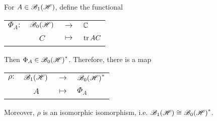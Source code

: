 \documentclass[a4paper,11pt]{report}
\begin{document}
\begin{thm}
	For $A \in \mathscr{B}_{1}\mathscr{(H)}$, define the functional
	\begin{center}
		\begin{tabular}{l c c l}
			$\Phi_A \colon$ & $\mathscr{B}_{0}\mathscr{(H)}$ & $\longrightarrow$ & $\mathbb{C}$ \\
			~ & $C$ & $\longmapsto$ & $\operatorname{tr}{AC}$
		\end{tabular}
	\end{center}
	Then $\Phi_A \in \mathscr{B}_{0}\mathscr{(H)}^{*}$. Therefore, there is a map
	\begin{center}
		\begin{tabular}{l c c l}
			$\rho \colon$ & $\mathscr{B}_{1}\mathscr{(H)}$ & $\longrightarrow$ & $\mathscr{B}_{0}\mathscr{(H)}^{*}$ \\
			~ & $A$ & $\longmapsto$ & $\Phi_A$
		\end{tabular}
	\end{center}
	Moreover, $\rho$ is an isomorphic isomorphism, i.e. $\mathscr{B}_{1}\mathscr{(H)} \cong \mathscr{B}_{0}\mathscr{(H)}^{*}$. 
\end{thm}
\end{document}
